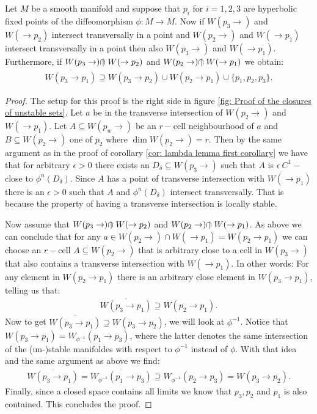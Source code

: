 \begin{corollary} \label{cor: transitivity of fixpoints}
Let $M$ be a smooth manifold and suppose that $p_i$ for $i=1,2,3$ are hyperbolic fixed points of the diffeomorphism $\phi:M\to M$. Now if $W(p_3\to) $ and $ W(\to p_2)$ intersect transversally in a point and $W(p_2\to) $ and $ W(\to p_1)$ intersect transversally in a point then also $W(p_3 \to )$ and $ W(\to p_1)$. Furthermore, if $W(p_3 \to) \text{$\cap\kern-0.4em|\kern0.4em$} W( \to p_2)$ and $W(p_2 \to) \text{$\cap\kern-0.4em|\kern0.4em$} W(\to p_1)$ we obtain:
\begin{align*}
\overline{W(p_3 \to p_1)} \supseteq W(p_3 \to p_2) \cup W(p_2 \to p_1) \cup \{p_1,p_2,p_3\}.
\end{align*} 
\end{corollary}
\begin{proof} The setup for this proof is the right side in figure \ref{fig: Proof of the closures of unstable sets}.
Let $a$ be in the transverse intersection of $W(p_2 \to )$ and $W(\to p_1 )$. Let $A\subseteq W(p_w \to)$ be an $r-$cell neighbourhood of $a$ and $B\subseteq W(p_2\to)$ one of $p_2$ where $\dim W(p_2 \to)=r$. Then by the same argument as in the proof of corollary \ref{cor: lambda lemma first corollary} we have that for arbitrary $\epsilon>0$ there exists an $D_\delta \subseteq W(p_3 \to)$  such that $A$ is $\epsilon~C^1-$close to $\phi^n(D_{\delta})$. Since $A$ has a point of transverse intersection with $W(\to p_1)$ there is an $\epsilon>0$ such that $A$ and $\phi^n(D_{\delta})$ intersect transversally. That is because the property of having a transverse intersection is locally stable.

Now assume that $W(p_3 \to) \text{$\cap\kern-0.4em|\kern0.4em$} W(\to p_2)$ and $W(p_2 \to) \text{$\cap\kern-0.4em|\kern0.4em$} W(\to p_1 )$. As above we can conclude that for any $a\in W(p_2 \to) \cap W(\to p_1 )=W(p_2 \to p_1)$ we can choose an $r-$cell $A\subseteq W( p_2\to)$ that is arbitrary close to a cell in $W(p_3 \to)$ that also contains a transverse intersection with $W(\to p_1)$. In other words: For any element in $W(p_2 \to p_1)$ there is an arbitrary close element in $W(p_3 \to p_1)$, telling us that:
\begin{align*}
\overline{W(p_3 \to p_1)} \supseteq W(p_2 \to p_1).
\end{align*} Now to get $\overline{W(p_3 \to p_1)} \supseteq W(p_3 \to p_2)$, we will look at $\phi^{-1}$. Notice that $W(p_3 \to p_1)=W_{\phi^{-1}}(p_1 \to p_3)$, where the latter denotes the same intersection of the (un-)stable manifoldes with respect to $\phi^{-1}$ instead of $\phi$. With that idea and the same argument as above we find:
\begin{align*}
\overline{W(p_3 \to p_1)}=\overline{W_{\phi^{-1}}(p_1 \to p_3)}\supseteq W_{\phi^{-1}}(p_2 \to p_3)=W(p_3 \to p_2).
\end{align*} Finally, since a closed space contains all limits we know that $p_3,p_2$ and $p_1$ is also contained. This concludes the proof. 
\end{proof}

